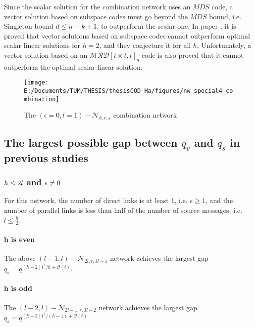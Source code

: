 Since the scalar solution for the combination network uses an $MDS$
code, a vector solution based on subspace codes must go beyond the
$MDS$ bound, i.e. Singleton bound $d\leq n-k+1$, to outperform the
scalar one. In paper \cite{Wachter-Zeh:2018}, it is proved that vector
solutions based on subspace codes cannot outperform optimal scalar
linear solutions for $h=2$, and they conjecture it for all $h$.
Unfortunately, a vector solution based on an $\mathcal{MRD}\left[t\times t,t\right]_{q}$
code is also proved that it cannot outperform the optimal scalar linear
solution.

\begin{figure}[H]
\caption{The $\left(\epsilon=0,l=1\right)-\mathcal{N}_{h,r,s}$ combination
network \label{fig:network_special4}}

\texttt{[image: E:/Documents/TUM/THESIS/thesisCOD\_Ha/figures/nw\_special4\_combination]}
\end{figure}


\subsection{The largest possible gap between $q_{v}$ and $q_{s}$ in previous
studies}

\subsubsection{$h\protect\leq2l$ and $\epsilon\protect\neq0$}

For this network, the number of direct links is at least 1, i.e. $\epsilon\geq1$,
and the number of parallel links is less than half of the number of
source messages, i.e. $l\leq\frac{h}{2}$.

\paragraph{h is even}

The above $\left(l-1,l\right)-\mathcal{N}_{2l,r,3l-1}$ network achieves
the largest gap $q_{s}=q^{(h-2)t^{2}/h+\mathcal{O}(t)}$.

\paragraph{h is odd}

The $\left(l-2,l\right)-\mathcal{N}_{2l-1,r,3l-2}$ network achieves
the largest gap $q_{s}=q^{\left(h-3\right)t^{2}/\left(h-1\right)+\mathcal{O}(t)}$

